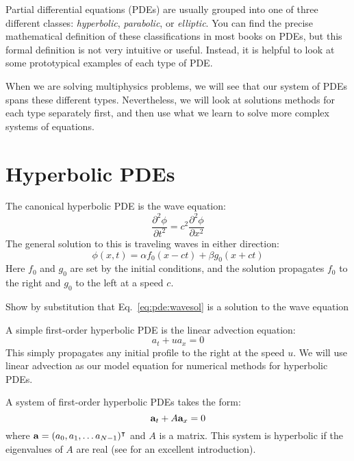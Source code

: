 Partial differential equations (PDEs) are usually grouped into one of
three different classes: {\em hyperbolic}, {\em parabolic}, or {\em
  elliptic}.  You can find the precise mathematical definition of
these classifications in most books on PDEs, but this formal definition
is not very intuitive or useful.  Instead, it is helpful to look at
some prototypical examples of each type of PDE.

When we are solving multiphysics problems, we will see that our 
system of PDEs spans these different types.  Nevertheless, we will
look at solutions methods for each type separately first, and then
use what we learn to solve more complex systems of equations.

\section{Hyperbolic PDEs}

The canonical hyperbolic PDE is the wave equation:
\begin{equation}
  \frac{\partial^2 \phi}{\partial t^2} = c^2 \frac{\partial^2 \phi}{\partial x^2}
\end{equation}   
The general solution to this is traveling waves in either direction:
\begin{equation}
\label{eq:pde:wavesol}
  \phi(x,t) = \alpha f_0(x - ct) + \beta g_0(x + ct)
\end{equation}
Here $f_0$ and $g_0$ are set by the initial
conditions, and the solution propagates $f_0$ to the right and $g_0$ to
the left at a speed $c$.

\begin{exercise}
{Show by substitution that Eq.~\ref{eq:pde:wavesol} is a solution
to the wave equation}
\end{exercise}

A simple first-order hyperbolic PDE is the linear advection equation:
\begin{equation}
a_t + u a_x = 0
\end{equation}
This simply propagates any initial profile to the right at the speed
$u$.  We will use linear advection as our model equation for numerical
methods for hyperbolic PDEs.

A system of first-order hyperbolic PDEs takes the form:
\begin{equation}
{\bf a}_t + A {\bf a}_x = 0
\end{equation}
where ${\bf a} = (a_0, a_1, \ldots a_{N-1})^\intercal$ and $A$ is a matrix.
This system is hyperbolic if the eigenvalues of $A$ are real (see
\cite{leveque:2002} for an excellent introduction).

